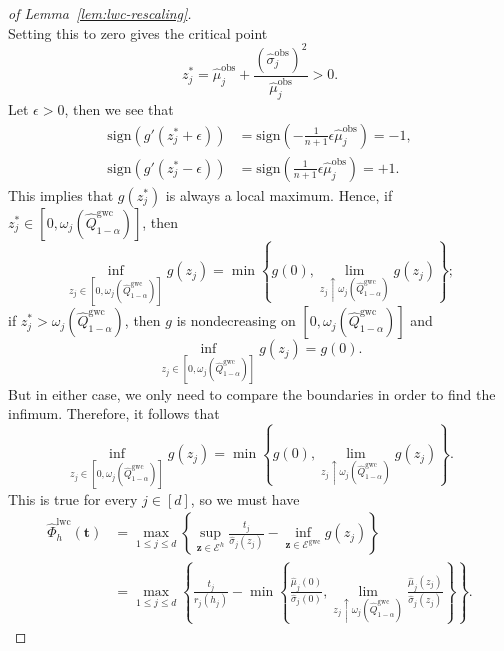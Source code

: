 \begin{proof}[of Lemma~\ref{lem:lwc-rescaling}]
\[\]
Setting this to zero gives the critical point
\[
z^\ast_j = \hat{\mu}^\mathrm{obs}_j + \frac{(\hat{\sigma}^\mathrm{obs}_j)^2}{\hat{\mu}^\mathrm{obs}_j}> 0.
\]
Let $\epsilon>0$, then we see that
\begin{align*}
    \mathrm{sign}(g'(z^*_j+\epsilon)) &= \mathrm{sign}\left(-\tfrac{1}{n+1}\epsilon\hat{\mu}^\mathrm{obs}_j\right) = -1,\\
    \mathrm{sign}(g'(z^*_j-\epsilon)) &= \mathrm{sign}\left(\tfrac{1}{n+1}\epsilon\hat{\mu}^\mathrm{obs}_j\right) = +1.
\end{align*}
This implies that $g(z^*_j)$ is always a local maximum. Hence, if $z^*_j \in [0, \omega_j(\hat{Q}^{\mathrm{gwc}}_{1-\alpha})]$, then 
\[
\inf_{z_j \in [0, \omega_j(\hat{Q}^{\mathrm{gwc}}_{1-\alpha})]}g(z_j) = \min\left\{g(0), \lim_{z_j \uparrow \omega_j(\hat{Q}^{\mathrm{gwc}}_{1-\alpha})}g(z_j)\right\};
\]
if $z^*_j > \omega_j(\hat{Q}^{\mathrm{gwc}}_{1-\alpha})$, then $g$ is nondecreasing on $[0, \omega_j(\hat{Q}^{\mathrm{gwc}}_{1-\alpha})]$ and 
\[
\inf_{z_j \in [0, \omega_j(\hat{Q}^{\mathrm{gwc}}_{1-\alpha})]}g(z_j) = g(0).
\]
But in either case, we only need to compare the boundaries in order to find the infimum. Therefore, it follows that
\[
\inf_{z_j \in [0, \omega_j(\hat{Q}^{\mathrm{gwc}}_{1-\alpha})]}g(z_j) = \min\left\{g(0), \lim_{z_j \uparrow \omega_j(\hat{Q}^{\mathrm{gwc}}_{1-\alpha})}g(z_j)\right\}.
\]
This is true for every $j \in [d]$, so we must have
\begin{align*}
  \hat{\Phi}^{\mathrm{lwc}}_h(\mathbf t) 
  &=\max_{1\leq j\leq d}\left\{\sup_{\mathbf z \in \mathcal{E}^h} \frac{t_j}{\hat{\sigma}_{j}(z_j)}-\inf_{\mathbf z \in \mathcal{E}^{\mathrm{gwc}}}g(z_j)\right\}\\
  & = \max_{1 \le j \le d}
\left\{\frac{t_j}{r_j(h_j)}-\min\left\{\frac{\hat{\mu}_{j}(0)}{\hat{\sigma}_{j}(0)}, \lim_{z_j \uparrow \omega_j(\hat{Q}^{\mathrm{gwc}}_{1-\alpha})}\frac{\hat{\mu}_{j}(z_j)}{\hat{\sigma}_{j}(z_j)}\right\}\right\}.
\end{align*}
\end{proof}

